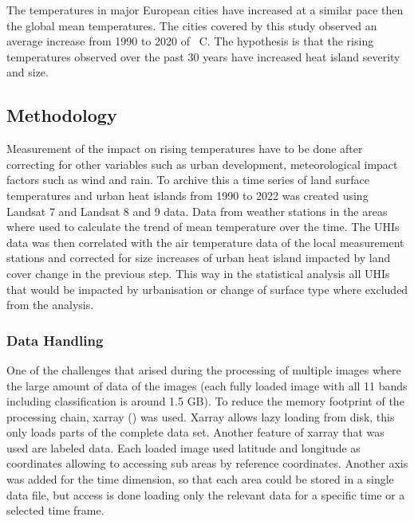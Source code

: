 \documentclass[12pt,a4paper, english]{article}
\begin{document}
    The temperatures in major European cities have increased at a similar pace then the global mean temperatures. 
    The cities covered by this study observed an average increase from 1990 to 2020 of %
    \textdegree\ C. 
%
    The hypothesis is that the rising temperatures observed over the past 30 years have increased heat island severity and size. 
    \subsection{Methodology}
    Measurement of the impact on rising temperatures have to be done after correcting for other variables such as urban development, meteorological impact factors such as wind and rain. 
    To archive this a time series of land surface temperatures and urban heat islands from 1990 to 2022 was created using Landsat 7 and Landsat 8 and 9 data.
    Data from weather stations in the areas where used to calculate the trend of mean temperature over the time. 
    The \glspl{UHI} data was then correlated with the air temperature data of the local measurement stations and corrected for size increases of urban heat island impacted by land cover change in the previous step. 
    This way in the statistical analysis all \glspl{UHI} that would be impacted by urbanisation or change of surface type where excluded from the analysis.
%
    \subsubsection{Data Handling}
    One of the challenges that arised during the processing of multiple images where the large amount of data of the images (each fully loaded image with all 11 bands including classification is around 1.5 GB).
    To reduce the memory footprint of the processing chain, xarray (\cite{hoyer2017xarray}) was used. 
    Xarray allows lazy loading from disk, this only loads parts of the complete data set. 
    Another feature of xarray that was used are labeled data. Each loaded image used latitude and longitude as coordinates allowing to accessing sub areas by reference coordinates. 
    Another axis was added for the time dimension, so that each area could be stored in a single data file, but access is done loading only the relevant data for a specific time or a selected time frame.
\end{document}
